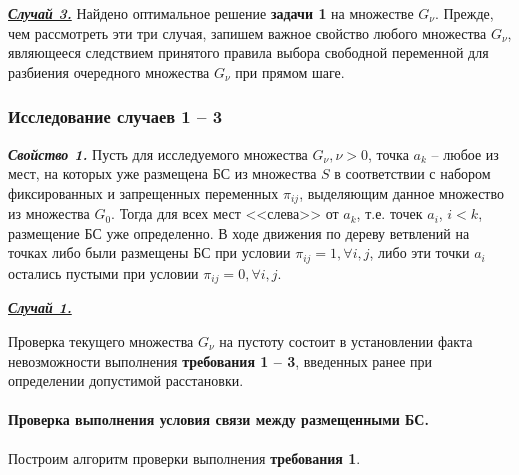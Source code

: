 \underline{\textit{\textbf{Случай 3.}}} Найдено оптимальное решение \textbf{задачи 1} на множестве $G_\nu$.
Прежде, чем рассмотреть эти три случая, запишем важное свойство любого множества $G_\nu$, являющееся следствием принятого правила выбора свободной переменной для разбиения очередного множества $G_\nu$ при прямом шаге. 



\subsubsection{Исследование случаев 1 – 3}

\textit{\textbf{Свойство 1.}} Пусть для исследуемого множества $G_\nu, \nu > 0$, точка $a_k$ -- любое из мест, на которых уже размещена БС из множества $S$ в соответствии с набором фиксированных и запрещенных переменных $\pi_{ij}$, выделяющим данное множество из множества $G_0$. Тогда для всех мест <<слева>> от $a_k$, т.е. точек $a_i$, $i<k$, размещение БС уже определенно. В ходе движения по дереву ветвлений на точках  либо были размещены БС при условии $\pi_{ij} =1 , \forall i, j$, либо эти точки $a_i$ остались пустыми при условии $\pi_{ij} =0 , \forall i, j$.

\underline{\textit{\textbf{Случай 1.}}}

Проверка текущего множества $G_\nu$ на пустоту состоит в установлении факта невозможности выполнения \textbf{требования 1 -- 3}, введенных ранее при определении допустимой расстановки.




\paragraph{Проверка выполнения условия связи между размещенными БС.}

Построим алгоритм проверки выполнения \textbf{требования 1}.



